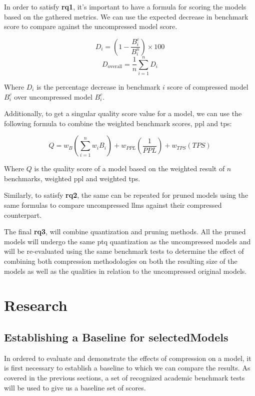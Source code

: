 \documentclass{ifacconf}
\begin{document}
	In order to satisfy \textbf{\gls{rq}1}, it's important to have a formula for scoring the models based on the gathered metrics. We can use the expected decrease in benchmark score to compare against the uncompressed model score. 
	
	$$
		D_i = \left(1 - \frac{B_i^c}{B_i^u}\right) \times 100
	$$
	$$
		D_{\text{overall}} = \frac{1}{n} \sum_{i=1}^{n} D_i
	$$
	
	Where $D_i$ is the percentage decrease in benchmark $i$ score of compressed model $B_i^c$ over uncompressed model $B_i^c$.
	
	Additionally, to get a singular quality score value for a model, we can use the following formula to combine the weighted benchmark scores, \gls{ppl} and \gls{tps}:
	
	$$
	Q = w_{B} \left( \sum_{i=1}^{n} w_i B_i \right) + w_{PPL} \left( \frac{1}{PPL} \right) + w_{TPS}(TPS) 
	$$
	
	Where $Q$ is the quality score of a model based on the weighted result of $n$ benchmarks, weighted \gls{ppl} and weighted \gls{tps}.
	
	Similarly, to satisfy \textbf{\gls{rq}2}, the same can be repeated for pruned models using the same formulas to compare uncompressed \glspl{llm} against their compressed counterpart.
	
	The final \textbf{\gls{rq}3}, will combine quantization and pruning methods. All the pruned models will undergo the same \gls{ptq} quantization as the uncompressed models and will be re-evaluated using the same benchmark tests to determine the effect of combining both compression methodologies on both the resulting size of the models as well as the qualities in relation to the uncompressed original models.

    \vfill
	\clearpage
    \pagebreak
	
	\section{Research}
	\subsection{Establishing a Baseline for \gls{selectedModels}}
    In ordered to evaluate and demonstrate the effects of compression on a model, it is first necessary to establish a baseline to which we can compare the results. As covered in the previous sections, a set of recognized academic benchmark tests will be used to give us a baseline set of scores.
\end{document}
